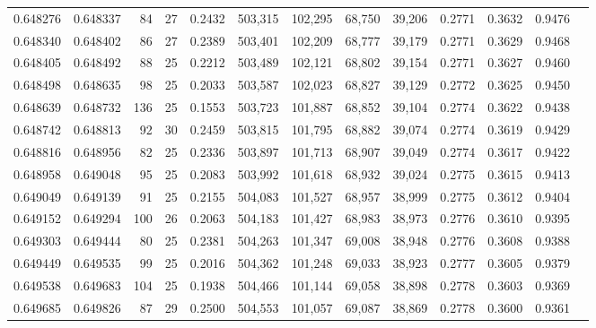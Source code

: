 \begin{tabular}{rrrrrrrrrrrrr}
0.648276 & 0.648337 &    84 &  27 &                                     0.2432 & 503,315 & 102,295 &  68,750 &  39,206 & 0.2771 & 0.3632 & 0.9476 \\
0.648340 & 0.648402 &    86 &  27 &                                     0.2389 & 503,401 & 102,209 &  68,777 &  39,179 & 0.2771 & 0.3629 & 0.9468 \\
0.648405 & 0.648492 &    88 &  25 &                                     0.2212 & 503,489 & 102,121 &  68,802 &  39,154 & 0.2771 & 0.3627 & 0.9460 \\
0.648498 & 0.648635 &    98 &  25 &                                     0.2033 & 503,587 & 102,023 &  68,827 &  39,129 & 0.2772 & 0.3625 & 0.9450 \\
0.648639 & 0.648732 &   136 &  25 &                                     0.1553 & 503,723 & 101,887 &  68,852 &  39,104 & 0.2774 & 0.3622 & 0.9438 \\
0.648742 & 0.648813 &    92 &  30 &                                     0.2459 & 503,815 & 101,795 &  68,882 &  39,074 & 0.2774 & 0.3619 & 0.9429 \\
0.648816 & 0.648956 &    82 &  25 &                                     0.2336 & 503,897 & 101,713 &  68,907 &  39,049 & 0.2774 & 0.3617 & 0.9422 \\
0.648958 & 0.649048 &    95 &  25 &                                     0.2083 & 503,992 & 101,618 &  68,932 &  39,024 & 0.2775 & 0.3615 & 0.9413 \\
0.649049 & 0.649139 &    91 &  25 &                                     0.2155 & 504,083 & 101,527 &  68,957 &  38,999 & 0.2775 & 0.3612 & 0.9404 \\
0.649152 & 0.649294 &   100 &  26 &                                     0.2063 & 504,183 & 101,427 &  68,983 &  38,973 & 0.2776 & 0.3610 & 0.9395 \\
0.649303 & 0.649444 &    80 &  25 &                                     0.2381 & 504,263 & 101,347 &  69,008 &  38,948 & 0.2776 & 0.3608 & 0.9388 \\
0.649449 & 0.649535 &    99 &  25 &                                     0.2016 & 504,362 & 101,248 &  69,033 &  38,923 & 0.2777 & 0.3605 & 0.9379 \\
0.649538 & 0.649683 &   104 &  25 &                                     0.1938 & 504,466 & 101,144 &  69,058 &  38,898 & 0.2778 & 0.3603 & 0.9369 \\
0.649685 & 0.649826 &    87 &  29 &                                     0.2500 & 504,553 & 101,057 &  69,087 &  38,869 & 0.2778 & 0.3600 & 0.9361 \\

\end{tabular}
